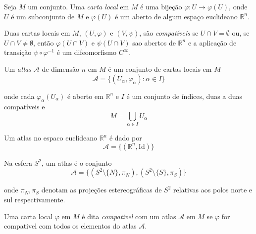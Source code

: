 \begin{defi}
	Seja $M$ um conjunto. Uma \emph{carta local} em $M$ é uma bijeção $\varphi: U \rightarrow \varphi(U)$, onde $U$ é um subconjunto de $M$ e $\varphi(U)$ é um aberto de algum espaço euclideano $\mathbb{R}^n$.
\end{defi}

\begin{defi}
	Duas cartas locais em $M$, $(U, \varphi)$ e $(V, \psi)$, são \emph{compatíveis} se $U \cap V = \emptyset$ ou, se $U \cap V \neq \emptyset$, então $\varphi(U \cap V)$ e $\psi(U \cap V)$ sao abertos de $\mathbb{R}^n$ e a aplicação de transição $\psi \circ \varphi^{-1}$ é um difeomorfismo $C^{\infty}$.
\end{defi}

\begin{defi}
	Um \emph{atlas} $\mathcal{A}$ de dimensão $n$ em $M$ é um conjunto de cartas locais em $M$
	\begin{equation*}
		\mathcal{A} = \{ (U_{\alpha}, \varphi_{\alpha}):  \alpha \in I \}
	\end{equation*}
	
	onde cada $\varphi_{\alpha}(U_{\alpha})$ é aberto em $\mathbb{R}^n$ e $I$ é um conjunto de índices, duas a duas compatíveis e
	\begin{equation*}
		M = \bigcup_{\alpha \in I} U_{\alpha}
	\end{equation*}
\end{defi}

\begin{exemplo}
	Um atlas no espaco euclideano $\mathbb{R}^n$ é dado por
	\begin{equation*}
		\mathcal{A} = \{ (\mathbb{R}^n, \text{Id}) \}
	\end{equation*}
\end{exemplo}

\begin{exemplo}
	Na esfera $S^2$, um atlas é o conjunto
	\begin{equation*}
		\mathcal{A} = \{ (S^2 \setminus \{N\}, \pi_N), (S^2 \setminus \{S\}, \pi_S) \}
	\end{equation*}
	
	onde $\pi_N, \pi_S$ denotam as projeções estereográficas de $S^2$ relativas aos polos norte e sul respectivamente.
\end{exemplo}

\begin{defi}
	Uma carta local $\varphi$ em $M$ é dita \emph{compativel} com um atlas $\mathcal{A}$ em $M$ se $\varphi$ for compativel com todos os elementos do atlas $\mathcal{A}$.
\end{defi}

